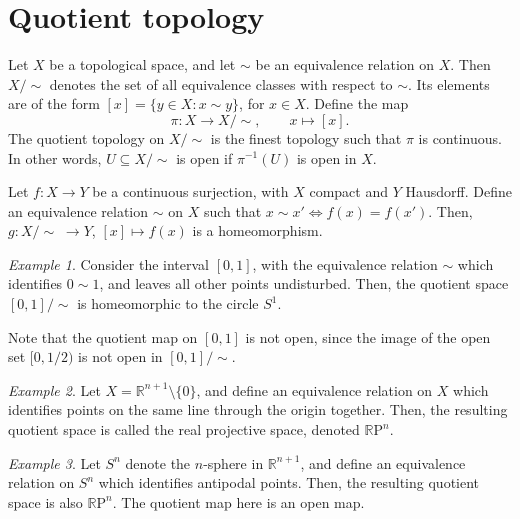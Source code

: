 \documentclass[11pt]{article}
\newcommand{\R}{\mathbb{R}}
\newcommand{\RP}{\R\mathrm{P}}
\theoremstyle{definition}
\theoremstyle{remark}
\newtheorem*{example}{Example}
\numberwithin{equation}{section}
\begin{document}
    \section{Quotient topology}
    
    \begin{definition}
        Let $X$ be a topological space, and let $\sim$ be an equivalence relation on
        $X$. Then $X/\!\sim$ denotes the set of all equivalence classes with respect
        to $\sim$. Its elements are of the form $[x] = \{y \in X : x \sim y\}$, for
        $x \in X$. Define the map \[
            \pi\colon X \to X/\!\sim, \qquad x \mapsto [x].
        \] The quotient topology on $X/\sim$ is the finest topology such that $\pi$
        is continuous. In other words, $U \subseteq X/\!\sim$ is open if
        $\pi^{-1}(U)$ is open in $X$.
    \end{definition}

    \begin{lemma}
        Let $f\colon X \to Y$ be a continuous surjection, with $X$ compact and $Y$
        Hausdorff. Define an equivalence relation $\sim$ on $X$ such that $x\sim
        x'\Leftrightarrow f(x) = f(x')$. Then, $g\colon X/\!\sim \;\to Y$, $[x]
        \mapsto f(x)$ is a homeomorphism.
    \end{lemma}
    \begin{example}
        Consider the interval $[0, 1]$, with the equivalence relation $\sim$ which
        identifies $0 \sim 1$, and leaves all other points undisturbed. Then, the
        quotient space $[0, 1]/\!\sim$ is homeomorphic to the circle $S^1$.

        Note that the quotient map on $[0, 1]$ is not open, since the image of the
        open set $[0, 1 / 2)$ is not open in $[0, 1]/\!\sim$.
    \end{example}
    \begin{example}
        Let $X = \R^{n + 1}\setminus\{0\}$, and define an equivalence relation on $X$
        which identifies points on the same line through the origin together. Then,
        the resulting quotient space is called the real projective space, denoted
        $\RP^n$.
    \end{example}
    \begin{example}
        Let $S^n$ denote the $n$-sphere in $\R^{n + 1}$, and define an equivalence
        relation on $S^n$ which identifies antipodal points. Then, the resulting
        quotient space is also $\RP^n$. The quotient map here is an open map.
    \end{example}
\end{document}
